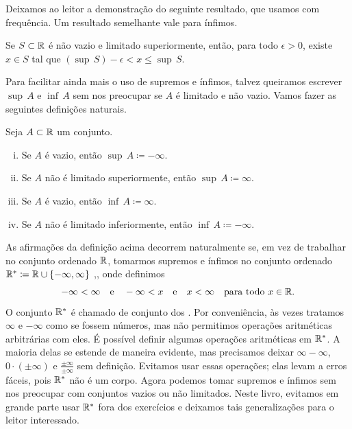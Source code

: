 \medskip
\pagebreak[1]

Deixamos ao leitor a demonstração do seguinte
resultado, que usamos com frequência.
Um resultado semelhante vale para ínfimos.

\begin{prop} \label{prop:existsxepsfromsup}
Se $S \subset {\mathbb{R}}$ é não vazio e limitado superiormente,
então, para todo $\epsilon > 0$, existe $x \in S$ tal
que $(\sup\, S) - \epsilon < x \leq \sup\, S$.
\end{prop}


Para facilitar ainda mais o uso de supremos e ínfimos, talvez queiramos
escrever $\sup\, A$ e $\inf\, A$ sem nos preocupar se $A$ é
limitado e não vazio. Vamos fazer as seguintes definições naturais.

\begin{defn}
Seja $A \subset {\mathbb{R}}$ um conjunto.
\begin{enumerate}[(i)]
\item Se $A$ é vazio, então $\sup\, A \coloneqq -\infty$.
\item Se $A$ não é limitado superiormente, então $\sup\, A \coloneqq \infty$.
\item Se $A$ é vazio, então $\inf\, A \coloneqq \infty$.
\item Se $A$ não é limitado inferiormente, então $\inf\, A \coloneqq -\infty$.
\end{enumerate}
\end{defn}

As afirmações da definição acima
decorrem naturalmente se, em vez de trabalhar no
conjunto ordenado ${\mathbb{R}}$, tomarmos supremos e ínfimos
no conjunto ordenado
${\mathbb{R}}^* \coloneqq {\mathbb{R}} \cup \{ -\infty , \infty\}$
,,
onde definimos
\begin{equation*}
-\infty < \infty \quad \text{e} \quad
-\infty < x \quad \text{e} \quad
x < \infty \quad \text{para todo $x \in {\mathbb{R}}$}.
\end{equation*}
O conjunto ${\mathbb{R}}^*$ é chamado de conjunto dos \emph{}.
Por conveniência, às vezes tratamos $\infty$ e $-\infty$ como se fossem
números, mas não permitimos operações aritméticas arbitrárias com eles.
É possível definir algumas operações aritméticas em ${\mathbb{R}}^*$. A maioria delas
se estende de maneira evidente, mas precisamos deixar
$\infty-\infty$, $0 \cdot (\pm\infty)$ e $\frac{\pm\infty}{\pm\infty}$
sem definição.
Evitamos
usar essas operações;
elas levam a erros fáceis, pois ${\mathbb{R}}^*$ não é um corpo.
Agora podemos tomar supremos e ínfimos sem nos preocupar com conjuntos vazios ou
não limitados. Neste livro, evitamos em grande parte
usar ${\mathbb{R}}^*$ fora dos exercícios e deixamos tais generalizações para o leitor interessado.

